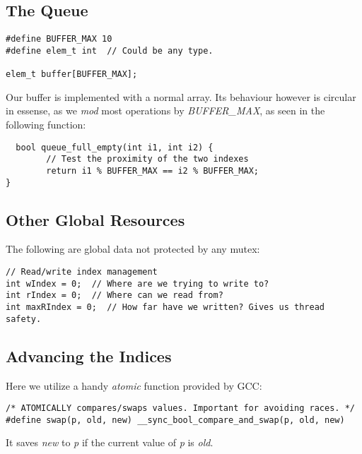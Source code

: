 \documentclass[titlepage]{article}
\begin{document}
\subsection{The Queue}
\begin{lstlisting}
#define BUFFER_MAX 10
#define elem_t int  // Could be any type.

elem_t buffer[BUFFER_MAX];  
\end{lstlisting}

Our buffer is implemented with a normal array.
Its behaviour however is circular in essense, as we \emph{mod} most operations by
\emph{BUFFER\_MAX}, as seen in the following function:
\begin{lstlisting}
  bool queue_full_empty(int i1, int i2) {
        // Test the proximity of the two indexes
        return i1 % BUFFER_MAX == i2 % BUFFER_MAX;
}
\end{lstlisting}

\subsection{Other Global Resources}
The following are global data not protected by any mutex:

\begin{lstlisting}
// Read/write index management
int wIndex = 0;  // Where are we trying to write to?
int rIndex = 0;  // Where can we read from?
int maxRIndex = 0;  // How far have we written? Gives us thread safety.
\end{lstlisting}

\subsection{Advancing the Indices}
Here we utilize a handy \emph{atomic} function provided by GCC:

\begin{lstlisting}
/* ATOMICALLY compares/swaps values. Important for avoiding races. */
#define swap(p, old, new) __sync_bool_compare_and_swap(p, old, new)
\end{lstlisting}
It saves \emph{new} to \emph{p} if the current value of \emph{p} is \emph{old}.
\end{document}
